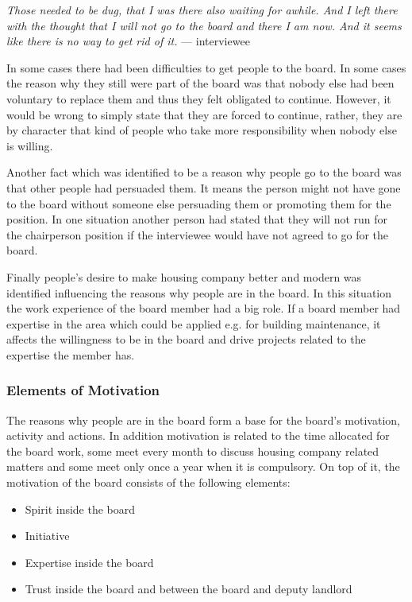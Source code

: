 \begin{displayquote}
\textit{Those needed to be dug, that I was there also waiting for awhile. And I left there with the thought that I will not go to the board and there I am now. And it seems like there is no way to get rid of it.} --- interviewee
\end{displayquote}

In some cases there had been difficulties to get people to the board. In some cases the reason why they still were part of the board was that nobody else had been voluntary to replace them and thus they felt obligated to continue. However, it would be wrong to simply state that they are forced to continue, rather, they are by character that kind of people who take more responsibility when nobody else is willing.

Another fact which was identified to be a reason why people go to the board was that other people had persuaded them. It means the person might not have gone to the board without someone else persuading them or promoting them for the position. In one situation another person had stated that they will not run for the chairperson position if the interviewee would have not agreed to go for the board.

Finally people's desire to make housing company better and modern was identified influencing the reasons why people are in the board. In this situation the work experience of the board member had a big role. If a board member had expertise in the area which could be applied e.g. for building maintenance, it affects the willingness to be in the board and drive projects related to the expertise the member has. 

\subsubsection*{Elements of Motivation}

The reasons why people are in the board form a base for the board's motivation, activity and actions. In addition motivation is related to the time allocated for the board work, some meet every month to discuss housing company related matters and some meet only once a year when it is compulsory.  On top of it, the motivation of the board consists of the following elements:
\begin{itemize}

	\setlength{\itemsep}{1pt}
	\item Spirit inside the board
	\item Initiative
	\item Expertise inside the board
	\item Trust inside the board and between the board and deputy landlord
\end{itemize}

